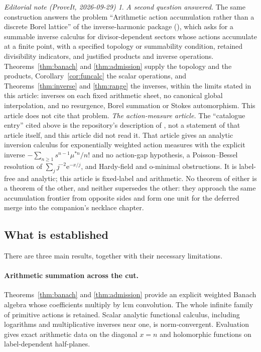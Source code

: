 \documentclass[11pt,a4paper]{article}
\numberwithin{equation}{section}
\theoremstyle{definition}
\theoremstyle{remark}
\newtheorem*{ednote}{Editorial note (ProveIt, 2026-09-29)}
\newcommand{\ee}{\mathrm e}
\begin{document}
\begin{ednote}\label{ed:siblings}
\emph{A second question answered.} The same construction answers the
problem ``Arithmetic action accumulation rather than a discrete Borel
lattice'' of the inverse-harmonic package
(),
which asks for a summable inverse calculus for divisor-dependent sectors
whose actions accumulate at a finite point, with a specified topology or
summability condition, retained divisibility indicators, and justified
products and inverse operations. Theorems~\ref{thm:banach} and
\ref{thm:admission} supply the topology and the products,
Corollary~\ref{cor:funcalc} the scalar operations, and
Theorems~\ref{thm:inverse} and \ref{thm:range} the inverses, within the
limits stated in this article: inverses on each fixed arithmetic sheet, no
canonical global interpolation, and no resurgence, Borel summation or
Stokes automorphism. This article does not cite that problem.
\emph{The action-measure article.} The ``catalogue entry'' cited above is
the repository's description of
,
not a statement of that article itself, and this article did not read it.
That article gives an analytic inversion calculus for exponentially
weighted action measures with the explicit inverse
$-\sum_{n\ge1}s^{n-1}\mu^{*n}/n!$ and no action-gap hypothesis, a
Poisson--Bessel resolution of $\sum_j j^{-2}\ee^{-x/j}$, and Hardy-field
and o-minimal obstructions. It is label-free and analytic; this article is
fixed-label and arithmetic. No theorem of either is a theorem of the
other, and neither supersedes the other: they approach the same
accumulation frontier from opposite sides and form one unit for the
deferred merge into the companion's necklace chapter.
\end{ednote}

\subsection{What is established}

There are three main results, together with their necessary limitations.

\paragraph{Arithmetic summation across the cut.}
Theorems~\ref{thm:banach} and \ref{thm:admission} provide an explicit
weighted Banach algebra whose coefficients multiply by lcm convolution.
The whole infinite family of primitive actions is retained. Scalar analytic
functional calculus, including logarithms and multiplicative inverses near
one, is norm-convergent. Evaluation gives exact arithmetic data on the
diagonal $x=n$ and holomorphic functions on label-dependent half-planes.
\end{document}
